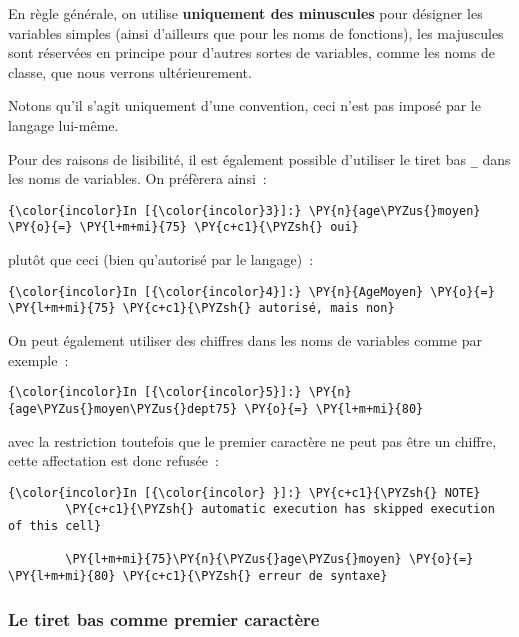     En règle générale, on utilise \textbf{uniquement des minuscules} pour
désigner les variables simples (ainsi d'ailleurs que pour les noms de
fonctions), les majuscules sont réservées en principe pour d'autres
sortes de variables, comme les noms de classe, que nous verrons
ultérieurement.

Notons qu'il s'agit uniquement d'une convention, ceci n'est pas imposé
par le langage lui-même.

    Pour des raisons de lisibilité, il est également possible d'utiliser le
tiret bas \texttt{\_} dans les noms de variables. On préfèrera ainsi~:

    \begin{Verbatim}[commandchars=\\\{\}]
{\color{incolor}In [{\color{incolor}3}]:} \PY{n}{age\PYZus{}moyen} \PY{o}{=} \PY{l+m+mi}{75} \PY{c+c1}{\PYZsh{} oui}
\end{Verbatim}


    plutôt que ceci (bien qu'autorisé par le langage)~:

    \begin{Verbatim}[commandchars=\\\{\}]
{\color{incolor}In [{\color{incolor}4}]:} \PY{n}{AgeMoyen} \PY{o}{=} \PY{l+m+mi}{75} \PY{c+c1}{\PYZsh{} autorisé, mais non}
\end{Verbatim}


    On peut également utiliser des chiffres dans les noms de variables comme
par exemple~:

    \begin{Verbatim}[commandchars=\\\{\}]
{\color{incolor}In [{\color{incolor}5}]:} \PY{n}{age\PYZus{}moyen\PYZus{}dept75} \PY{o}{=} \PY{l+m+mi}{80}
\end{Verbatim}


    avec la restriction toutefois que le premier caractère ne peut pas être
un chiffre, cette affectation est donc refusée~:

    \begin{Verbatim}[commandchars=\\\{\}]
{\color{incolor}In [{\color{incolor} }]:} \PY{c+c1}{\PYZsh{} NOTE}
        \PY{c+c1}{\PYZsh{} automatic execution has skipped execution of this cell}
        
        \PY{l+m+mi}{75}\PY{n}{\PYZus{}age\PYZus{}moyen} \PY{o}{=} \PY{l+m+mi}{80} \PY{c+c1}{\PYZsh{} erreur de syntaxe}
\end{Verbatim}


    \hypertarget{le-tiret-bas-comme-premier-caractuxe8re}{%
\subsubsection{Le tiret bas comme premier
caractère}\label{le-tiret-bas-comme-premier-caractuxe8re}}

